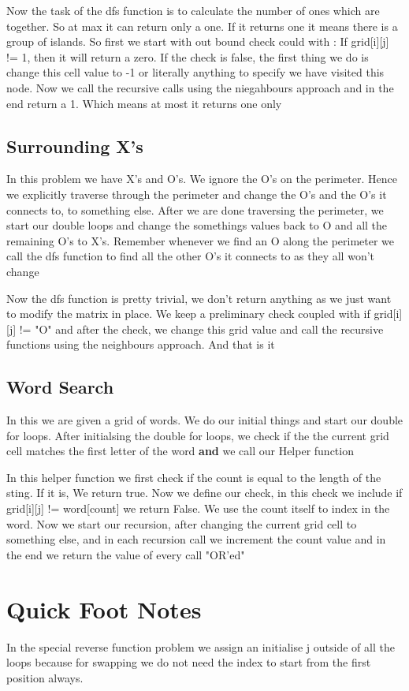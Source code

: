 \documentclass{article}
\newcommand{\nd}{\noindent}
\begin{document}
\nd Now the task of the dfs function is to calculate the number of ones which are together. So at max it can return only a one. If it returns one it means there is a group of islands. So first we start with out bound check could with : If grid[i][j] != 1, then it will return a zero. If the check is false, the first thing we do is change this cell value to -1 or literally anything to specify we have visited this node. Now we call the recursive calls using the niegahbours approach and in the end return a 1. Which means at most it returns one only 

\subsection{Surrounding X's}
In this problem we have X's and O's. We ignore the O's on the perimeter. Hence we explicitly traverse through the perimeter and change the O's and the O's it connects to, to something else. After we are done traversing the perimeter, we start our double loops and change the somethings values back to O and all the remaining O's to X's. Remember whenever we find an O along the perimeter we call the dfs function to find all the other O's it connects to as they all won't change 

\nd Now the dfs function is pretty trivial, we don't return anything as we just want to modify the matrix in place. We keep a preliminary check coupled with if grid[i][j] != "O" and after the check, we change this grid value and call the recursive functions using the neighbours approach. And that is it 

\subsection{Word Search}
In this we are given a grid of words. We do our initial things and start our double for loops. After initialsing the double for loops, we check if the the current grid cell matches the first letter of the word \textbf{and} we call our Helper function

\nd In this helper function we first check if the count is equal to the length of the sting. If it is, We return true. Now we define our check, in this check we include if grid[i][j] != word[count] we return False. We use the count itself to index in the word. Now we start our recursion, after changing the current grid cell to something else, and in each recursion call we increment the count value and in the end we return the value of every call "OR'ed"
\section {Quick Foot Notes }
In the special reverse function problem we assign an initialise j outside of all the loops because for swapping we do not need the index to start from the first position always. 
\end{document}
